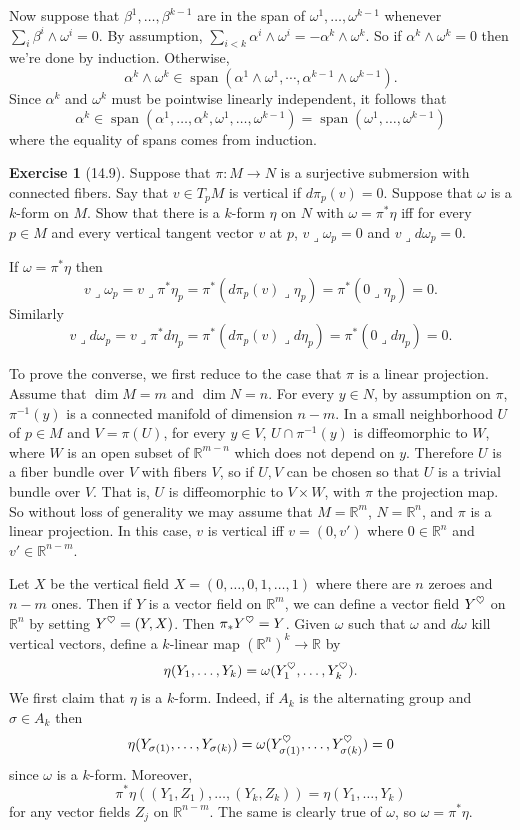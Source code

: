 \documentclass[10pt]{article}
\newcommand{\RR}{\mathbb{R}}
\newcommand{\spn}{\operatorname{span}}
\newcommand{\iprod}{\mathbin{\lrcorner}}
\newcommand{\heart}{\ensuremath\heartsuit}
\theoremstyle{definition}
\newtheorem{exer}{Exercise}
\begin{document}
Now suppose that $\beta^1, \dots, \beta^{k-1}$ are in the span of $\omega^1, \dots, \omega^{k-1}$ whenever $\sum_i \beta^i \wedge \omega^i = 0$.
By assumption, $\sum_{i<k} \alpha^i \wedge \omega^i = -\alpha^k \wedge \omega^k$.
So if $\alpha^k \wedge \omega^k = 0$ then we're done by induction. Otherwise,
$$\alpha^k \wedge \omega^k \in \spn(\alpha^1 \wedge \omega^1, \cdots, \alpha^{k-1} \wedge \omega^{k-1}).$$
Since $\alpha^k$ and $\omega^k$ must be pointwise linearly independent, it follows that
$$\alpha^k \in \spn(\alpha^1, \dots, \alpha^k, \omega^1, \dots, \omega^{k-1}) = \spn(\omega^1, \dots, \omega^{k-1})$$
where the equality of spans comes from induction.

\begin{exer}[14.9]
Suppose that $\pi: M \to N$ is a surjective submersion with connected fibers.
Say that $v \in T_pM$ is vertical if $d\pi_p(v) = 0$.
Suppose that $\omega$ is a $k$-form on $M$. Show that there is a $k$-form $\eta$ on $N$ with $\omega = \pi^*\eta$ iff for every $p \in M$ and every vertical tangent vector $v$ at $p$, $v \iprod \omega_p = 0$ and $v \iprod d\omega_p = 0$.
\end{exer}

If $\omega = \pi^*\eta$ then
$$v \iprod \omega_p = v \iprod \pi^*\eta_p = \pi^*(d\pi_p(v) \iprod \eta_p) = \pi^*(0 \iprod \eta_p) = 0.$$
Similarly
$$v \iprod d\omega_p = v \iprod \pi^*d\eta_p = \pi^*(d\pi_p(v) \iprod d\eta_p) = \pi^*(0 \iprod d\eta_p) = 0.$$

To prove the converse, we first reduce to the case that $\pi$ is a linear projection.
Assume that $\dim M = m$ and $\dim N = n$.
For every $y \in N$, by assumption on $\pi$, $\pi^{-1}(y)$ is a connected manifold of dimension $n - m$.
In a small neighborhood $U$ of $p \in M$ and $V = \pi(U)$, for every $y \in V$, $U \cap \pi^{-1}(y)$ is diffeomorphic to $W$, where $W$ is an open subset of $\RR^{m - n}$ which does not depend on $y$.
Therefore $U$ is a fiber bundle over $V$ with fibers $V$, so if $U,V$ can be chosen so that $U$ is a trivial bundle over $V$.
That is, $U$ is diffeomorphic to $V \times W$, with $\pi$ the projection map.
So without loss of generality we may assume that $M = \RR^m$, $N = \RR^n$, and $\pi$ is a linear projection.
In this case, $v$ is vertical iff $v = (0, v')$ where $0 \in \RR^n$ and $v' \in \RR^{n - m}$.

Let $X$ be the vertical field $X = (0, \dots, 0, 1, \dots, 1)$ where there are $n$ zeroes and $n - m$ ones.
Then if $Y$ is a vector field on $\RR^m$, we can define a vector field $Y^\heart$ on $\RR^n$ by setting $Y^\heart = (Y, X)$.
Then $\pi_*Y^\heart = Y$.
Given $\omega$ such that $\omega$ and $d\omega$ kill vertical vectors, define a $k$-linear map $(\RR^n)^k \to \RR$ by
$$\eta(Y_1, \dots, Y_k) = \omega(Y_1^\heart, \dots, Y_k^\heart).$$
We first claim that $\eta$ is a $k$-form. Indeed, if $A_k$ is the alternating group and $\sigma \in A_k$ then
$$\eta(Y_{\sigma(1)}, \dots, Y_{\sigma(k)}) = \omega(Y_{\sigma(1)}^\heart, \dots, Y_{\sigma(k)}^\heart) = 0$$
since $\omega$ is a $k$-form.
Moreover,
$$\pi^*\eta((Y_1, Z_1), \dots, (Y_k, Z_k)) = \eta(Y_1, \dots, Y_k)$$
for any vector fields $Z_j$ on $\RR^{n - m}$. The same is clearly true of $\omega$, so $\omega = \pi^*\eta$.
\end{document}
